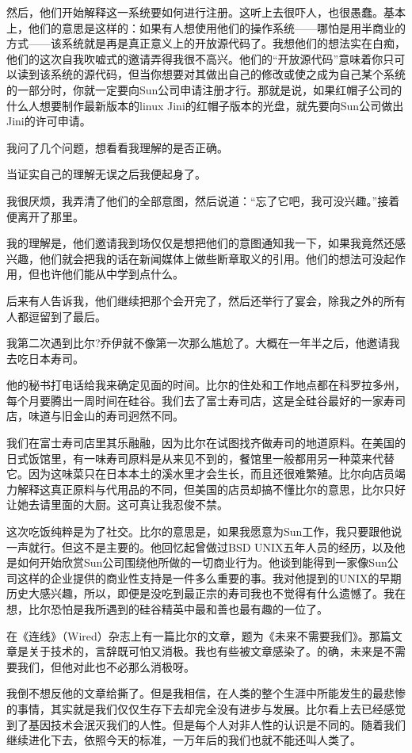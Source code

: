 然后，他们开始解释这一系统要如何进行注册。这听上去很吓人，也很愚蠢。基本上，他们的意思是这样的：如果有人想使用他们的操作系统——哪怕是用半商业的方式——该系统就是再是真正意义上的开放源代码了。我想他们的想法实在白痴，他们的这次自我吹嘘式的邀请弄得我很不高兴。他们的“开放源代码”意味着你只可以读到该系统的源代码，但当你想要对其做出自己的修改或使之成为自己某个系统的一部分时，你就一定要向Sun公司申请注册才行。那就是说，如果红帽子公司的什么人想要制作最新版本的linux Jini的红帽子版本的光盘，就先要向Sun公司做出Jini的许可申请。

我问了几个问题，想看看我理解的是否正确。

当证实自己的理解无误之后我便起身了。

我很厌烦，我弄清了他们的全部意图，然后说道：“忘了它吧，我可没兴趣。”接着便离开了那里。

我的理解是，他们邀请我到场仅仅是想把他们的意图通知我一下，如果我竟然还感兴趣，他们就会把我的话在新闻媒体上做些断章取义的引用。他们的想法可没起作用，但也许他们能从中学到点什么。

后来有人告诉我，他们继续把那个会开完了，然后还举行了宴会，除我之外的所有人都逗留到了最后。

我第二次遇到比尔?乔伊就不像第一次那么尴尬了。大概在一年半之后，他邀请我去吃日本寿司。

他的秘书打电话给我来确定见面的时间。比尔的住处和工作地点都在科罗拉多州，每个月要腾出一周时间在硅谷。我们去了富士寿司店，这是全硅谷最好的一家寿司店，味道与旧金山的寿司迥然不同。

我们在富士寿司店里其乐融融，因为比尔在试图找齐做寿司的地道原料。在美国的日式饭馆里，有一味寿司原料是从来见不到的，餐馆里一般都用另一种菜来代替它。因为这味菜只在日本本土的溪水里才会生长，而且还很难繁殖。比尔向店员竭力解释这真正原料与代用品的不同，但美国的店员却搞不懂比尔的意思，比尔只好让她去请里面的大厨。这可真让我忍俊不禁。

这次吃饭纯粹是为了社交。比尔的意思是，如果我愿意为Sun工作，我只要跟他说一声就行。但这不是主要的。他回忆起曾做过BSD UNIX五年人员的经历，以及他是如何开始欣赏Sun公司围绕他所做的一切商业行为。他谈到能得到一家像Sun公司这样的企业提供的商业性支持是一件多么重要的事。我对他提到的UNIX的早期历史大感兴趣，所以，即便是没吃到最正宗的寿司我也不觉得有什么遗憾了。我在想，比尔恐怕是我所遇到的硅谷精英中最和善也最有趣的一位了。

在《连线》（Wired）杂志上有一篇比尔的文章，题为《未来不需要我们》。那篇文章是关于技术的，言辞既可怕又消极。我也有些被文章感染了。的确，未来是不需要我们，但他对此也不必那么消极呀。

我倒不想反他的文章给撕了。但是我相信，在人类的整个生涯中所能发生的最悲惨的事情，其实就是我们仅仅生存下去却完全没有进步与发展。比尔看上去已经感觉到了基因技术会泯灭我们的人性。但是每个人对非人性的认识是不同的。随着我们继续进化下去，依照今天的标准，一万年后的我们也就不能还叫人类了。

